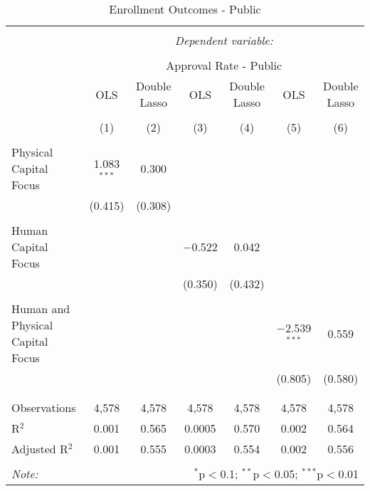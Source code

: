 
\begin{table}[!htbp] \centering 
  \caption{Enrollment Outcomes - Public} 
  \label{} 
\begin{tabular}{@{\extracolsep{5pt}}lcccccc} 
\\[-1.8ex]\hline 
\hline \\[-1.8ex] 
 & \multicolumn{6}{c}{\textit{Dependent variable:}} \\ 
\cline{2-7} 
\\[-1.8ex] & \multicolumn{6}{c}{Approval Rate - Public} \\ 
 & OLS & Double Lasso & OLS & Double Lasso & OLS & Double Lasso \\ 
\\[-1.8ex] & (1) & (2) & (3) & (4) & (5) & (6)\\ 
\hline \\[-1.8ex] 
 Physical Capital Focus & 1.083$^{***}$ & 0.300 &  &  &  &  \\ 
  & (0.415) & (0.308) &  &  &  &  \\ 
  & & & & & & \\ 
 Human Capital Focus &  &  & $-$0.522 & 0.042 &  &  \\ 
  &  &  & (0.350) & (0.432) &  &  \\ 
  & & & & & & \\ 
 Human and Physical Capital Focus &  &  &  &  & $-$2.539$^{***}$ & 0.559 \\ 
  &  &  &  &  & (0.805) & (0.580) \\ 
  & & & & & & \\ 
\hline \\[-1.8ex] 
Observations & 4,578 & 4,578 & 4,578 & 4,578 & 4,578 & 4,578 \\ 
R$^{2}$ & 0.001 & 0.565 & 0.0005 & 0.570 & 0.002 & 0.564 \\ 
Adjusted R$^{2}$ & 0.001 & 0.555 & 0.0003 & 0.554 & 0.002 & 0.556 \\ 
\hline 
\hline \\[-1.8ex] 
\textit{Note:}  & \multicolumn{6}{r}{$^{*}$p$<$0.1; $^{**}$p$<$0.05; $^{***}$p$<$0.01} \\ 
\end{tabular} 
\end{table} 
